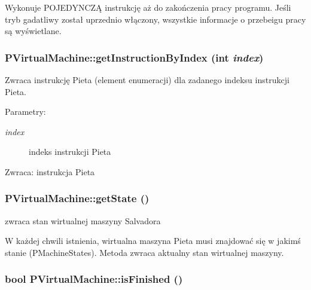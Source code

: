Wykonuje POJEDYNCZĄ instrukcję aż do zakończenia pracy programu. Jeśli tryb gadatliwy został uprzednio włączony, wszystkie informacje o przebeigu pracy są wyświetlane. \hypertarget{classPVirtualMachine_69d12176d3f9719b2bdf93a9f55cefde}{
\subsubsection[{getInstructionByIndex}]{ PVirtualMachine::getInstructionByIndex (int {\em index})}}
\label{classPVirtualMachine_69d12176d3f9719b2bdf93a9f55cefde}


Zwraca instrukcję Pieta (element enumeracji) dla zadanego indeksu instrukcji Pieta. \begin{Desc}
\item[Parametry:]
\begin{description}
\item[{\em index}]indeks instrukcji Pieta \end{description}
\end{Desc}
\begin{Desc}
\item[Zwraca:]instrukcja Pieta \end{Desc}
\hypertarget{classPVirtualMachine_699839f4df2106065458127c36b4bfca}{
\subsubsection[{getState}]{ PVirtualMachine::getState ()}}
\label{classPVirtualMachine_699839f4df2106065458127c36b4bfca}


zwraca stan wirtualnej maszyny Salvadora 

W każdej chwili istnienia, wirtualna maszyna Pieta musi znajdować się w jakimś stanie (PMachineStates). Metoda zwraca aktualny stan wirtualnej maszyny. \hypertarget{classPVirtualMachine_6b19e3e51a584b13e79c44fc5b842c2b}{
\subsubsection[{isFinished}]{\setlength{\rightskip}{0pt plus 5cm}bool PVirtualMachine::isFinished ()}}
\label{classPVirtualMachine_6b19e3e51a584b13e79c44fc5b842c2b}


